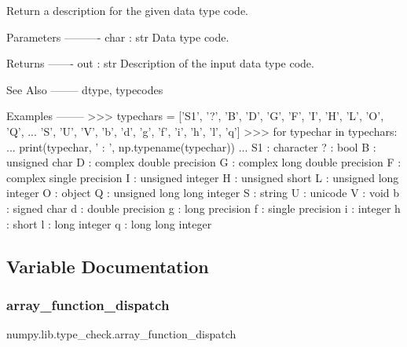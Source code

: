 \begin{DoxyVerb}Return a description for the given data type code.

Parameters
----------
char : str
    Data type code.

Returns
-------
out : str
    Description of the input data type code.

See Also
--------
dtype, typecodes

Examples
--------
>>> typechars = ['S1', '?', 'B', 'D', 'G', 'F', 'I', 'H', 'L', 'O', 'Q',
...              'S', 'U', 'V', 'b', 'd', 'g', 'f', 'i', 'h', 'l', 'q']
>>> for typechar in typechars:
...     print(typechar, ' : ', np.typename(typechar))
...
S1  :  character
?  :  bool
B  :  unsigned char
D  :  complex double precision
G  :  complex long double precision
F  :  complex single precision
I  :  unsigned integer
H  :  unsigned short
L  :  unsigned long integer
O  :  object
Q  :  unsigned long long integer
S  :  string
U  :  unicode
V  :  void
b  :  signed char
d  :  double precision
g  :  long precision
f  :  single precision
i  :  integer
h  :  short
l  :  long integer
q  :  long long integer\end{DoxyVerb}
 

\subsection{Variable Documentation}
\mbox{\label{namespacenumpy_1_1lib_1_1type__check_a25db2fa03bd3fb6ed8b645eec8868ff8}} 
\subsubsection{\texorpdfstring{array\+\_\+function\+\_\+dispatch}{array\_function\_dispatch}}
{\footnotesize\ttfamily numpy.\+lib.\+type\+\_\+check.\+array\+\_\+function\+\_\+dispatch}

\mbox{\label{namespacenumpy_1_1lib_1_1type__check_ae26d7c0b903378781ceca15875ccf3ff}} 
